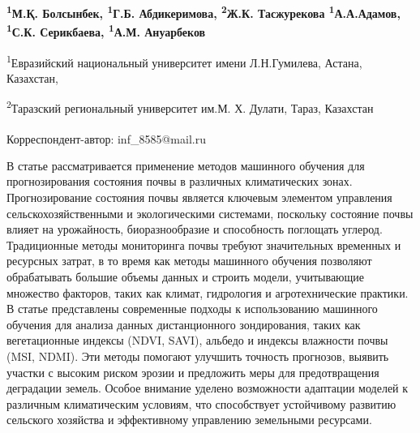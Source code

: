 \vspace{0.5em}
\begin{articleheader}

{\bfseries
\textsuperscript{1}М.Қ. Болсынбек,
\textsuperscript{1}Г.Б. Абдикеримова,
\textsuperscript{2}Ж.К. Тасжурекова
\textsuperscript{1}А.А.Адамов,
\textsuperscript{1}С.К. Серикбаева\textsuperscript{\envelope },
\textsuperscript{1}А.М. Ануарбеков
}
\end{articleheader}

\begin{affiliation}
\textsuperscript{1}Евразийский национальный университет имени Л.Н.Гумилева, Астана, Казахстан,

\textsuperscript{2}Таразский региональный университет им.М. Х. Дулати, Тараз, Казахстан

\raggedright \textsuperscript{\envelope }Корреспондент-автор: inf\_8585@mail.ru
\end{affiliation}

В статье рассматривается применение методов машинного обучения для
прогнозирования состояния почвы в различных климатических зонах.
Прогнозирование состояния почвы является ключевым элементом управления
сельскохозяйственными и экологическими системами, поскольку состояние
почвы влияет на урожайность, биоразнообразие и способность поглощать
углерод. Традиционные методы мониторинга почвы требуют значительных
временных и ресурсных затрат, в то время как методы машинного обучения
позволяют обрабатывать большие объемы данных и строить модели,
учитывающие множество факторов, таких как климат, гидрология и
агротехнические практики. В статье представлены современные подходы к
использованию машинного обучения для анализа данных дистанционного
зондирования, таких как вегетационные индексы (NDVI, SAVI), альбедо и
индексы влажности почвы (MSI, NDMI). Эти методы помогают улучшить
точность прогнозов, выявить участки с высоким риском эрозии и предложить
меры для предотвращения деградации земель. Особое внимание уделено
возможности адаптации моделей к различным климатическим условиям, что
способствует устойчивому развитию сельского хозяйства и эффективному
управлению земельными ресурсами.

